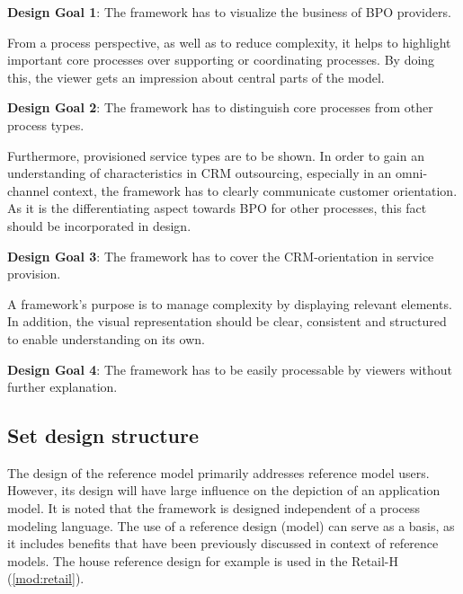 	\hfill\begin{minipage}{\dimexpr\textwidth-1.2cm}
		\textbf{Design Goal 1}: The framework has to visualize the business of BPO providers.
	\end{minipage}

From a process perspective, as well as to reduce complexity, it helps to highlight important core processes over supporting or coordinating processes. By doing this, the viewer gets an impression about central parts of the model. 

	\hfill\begin{minipage}{\dimexpr\textwidth-1.2cm}
	\textbf{Design Goal 2}: The framework has to distinguish core processes from other process types. 
\end{minipage}

Furthermore, provisioned service types are to be shown. In order to gain an understanding of characteristics in CRM outsourcing, especially in an omni-channel context, the framework has to clearly communicate customer orientation. As it is the differentiating aspect towards BPO for other processes, this fact should be incorporated in design.  

	\hfill\begin{minipage}{\dimexpr\textwidth-1.2cm}
	\textbf{Design Goal 3}: The framework has to cover the CRM-orientation in service provision. 
\end{minipage}

A framework's purpose is to manage complexity by displaying relevant elements. In addition, the visual representation should be clear, consistent and structured to enable understanding on its own. 

	\hfill\begin{minipage}{\dimexpr\textwidth-1.2cm}
	\textbf{Design Goal 4}: The framework has to be easily processable by viewers without further explanation. 
\end{minipage}

	\subsection{Set design structure}
	
	The design of the reference model primarily addresses reference model users. However, its design will have large influence on the depiction of an application model. It is noted that the framework is designed independent of a process modeling language. The use of a reference design (model) can serve as a basis, as it includes benefits that have been previously discussed in context of reference models. The house reference design for example is used in the Retail-H (\cf \ref{mod:retail}).
	
